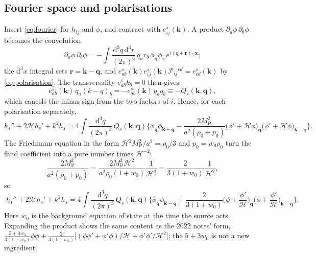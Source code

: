 \documentclass[11pt,a4paper]{article}
\newcommand{\cH}{\mathcal{H}}
\newcommand{\MP}{M_{\mathrm{P}}}
\newcommand{\dd}{\mathrm{d}}
\newcommand{\vk}{\mathbf{k}}
\newcommand{\vq}{\mathbf{q}}
\newcommand{\vr}{\mathbf{r}}
\newcommand{\vx}{\mathbf{x}}
\theoremstyle{remark}
\begin{document}
\subsection{Fourier space and polarisations}
\label{sec:tensor-fourier}

Insert \eqref{eq:fourier} for $h_{ij}$ and $\phi$, and contract with $e^s_{ij}(\vk)$. A product $\partial_a\phi\,\partial_b\phi$ becomes the convolution
\[
\partial_a\phi\,\partial_b\phi = -\int\frac{\dd^3q\,\dd^3r}{(2\pi)^6}\,q_ar_b\,\phi_{\vq}\phi_{\vr}\,e^{i(\vq+\vr)\cdot\vx};
\]
the $\dd^3x$ integral sets $\vr = \vk-\vq$, and $e^s_{ab}(\vk)e^s_{ij}(\vk)\mathcal{P}_{ij}{}^{cd} = e^s_{cd}(\vk)$ by \eqref{eq:polarisation}. The transversality $e^s_{ab}k_b = 0$ then gives
\begin{equation}
e^s_{ab}(\vk)\,q_a(k-q)_b = -e^s_{ab}(\vk)\,q_aq_b \equiv -Q_s(\vk,\vq),
\label{eq:Qs-def}
\end{equation}
which cancels the minus sign from the two factors of $i$. Hence, for each polarisation separately,
\begin{equation}
h_s'' + 2\cH h_s' + k^2h_s
= 4\int\frac{\dd^3q}{(2\pi)^3}\,Q_s(\vk,\vq)\Big\{\phi_{\vq}\phi_{\vk-\vq}
+ \frac{2\MP^2}{a^2(\rho_0+p_0)}\big(\phi'+\cH\phi\big)_{\vq}\big(\phi'+\cH\phi\big)_{\vk-\vq}\Big\}.
\label{eq:tensor-eq-fourier}
\end{equation}
The Friedmann equation in the form $\cH^2\MP^2/a^2 = \rho_0/3$ and $p_0 = w_0\rho_0$ turn the fluid coefficient into a pure number times $\cH^{-2}$:
\begin{equation}
\frac{2\MP^2}{a^2(\rho_0+p_0)} = \frac{2\MP^2\cH^2}{a^2\rho_0(1+w_0)}\frac{1}{\cH^2} = \frac{2}{3(1+w_0)}\frac{1}{\cH^2},
\label{eq:fluid-coefficient}
\end{equation}
so
\begin{equation}
\boxed{\;
h_s'' + 2\cH h_s' + k^2h_s
= 4\int\frac{\dd^3q}{(2\pi)^3}\,Q_s(\vk,\vq)\Big\{\phi_{\vq}\phi_{\vk-\vq}
+ \frac{2}{3(1+w_0)}\Big(\phi+\frac{\phi'}{\cH}\Big)_{\vq}\Big(\phi+\frac{\phi'}{\cH}\Big)_{\vk-\vq}\Big\}.\;}
\label{eq:tensor-eq-w}
\end{equation}
Here $w_0$ is the background equation of state at the time the source acts. Expanding the product shows the same content as the 2022 notes' form, $\tfrac{5+3w_0}{3(1+w_0)}\phi\phi + \tfrac{2}{3(1+w_0)}\big[(\phi\phi'+\phi'\phi)/\cH + \phi'\phi'/\cH^2\big]$; the $5+3w_0$ is not a new ingredient.
\end{document}
